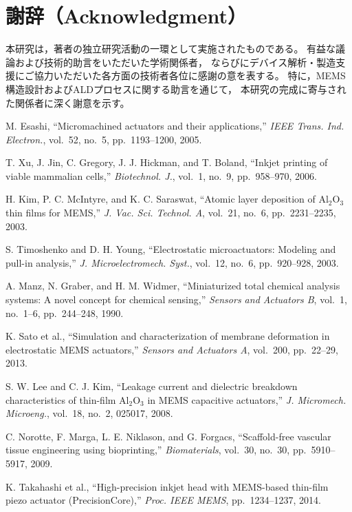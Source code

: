 \documentclass[conference]{IEEEtran}
\begin{document}
\section*{謝辞（Acknowledgment）}
本研究は，著者の独立研究活動の一環として実施されたものである。
有益な議論および技術的助言をいただいた学術関係者，
ならびにデバイス解析・製造支援にご協力いただいた各方面の技術者各位に感謝の意を表する。
特に，MEMS構造設計およびALDプロセスに関する助言を通じて，
本研究の完成に寄与された関係者に深く謝意を示す。

\balance

\begin{thebibliography}{99}

M. Esashi, ``Micromachined actuators and their applications,'' 
\emph{IEEE Trans. Ind. Electron.}, vol.~52, no.~5, pp.~1193–1200, 2005.

T. Xu, J. Jin, C. Gregory, J. J. Hickman, and T. Boland, 
``Inkjet printing of viable mammalian cells,'' 
\emph{Biotechnol. J.}, vol.~1, no.~9, pp.~958–970, 2006.

H. Kim, P. C. McIntyre, and K. C. Saraswat, 
``Atomic layer deposition of Al$_2$O$_3$ thin films for MEMS,'' 
\emph{J. Vac. Sci. Technol. A}, vol.~21, no.~6, pp.~2231–2235, 2003.

S. Timoshenko and D. H. Young, 
``Electrostatic microactuators: Modeling and pull-in analysis,'' 
\emph{J. Microelectromech. Syst.}, vol.~12, no.~6, pp.~920–928, 2003.

A. Manz, N. Graber, and H. M. Widmer, 
``Miniaturized total chemical analysis systems: A novel concept for chemical sensing,'' 
\emph{Sensors and Actuators B}, vol.~1, no.~1–6, pp.~244–248, 1990.

K. Sato et al., 
``Simulation and characterization of membrane deformation in electrostatic MEMS actuators,'' 
\emph{Sensors and Actuators A}, vol.~200, pp.~22–29, 2013.

S. W. Lee and C. J. Kim, 
``Leakage current and dielectric breakdown characteristics of thin-film Al$_2$O$_3$ in MEMS capacitive actuators,'' 
\emph{J. Micromech. Microeng.}, vol.~18, no.~2, 025017, 2008.

C. Norotte, F. Marga, L. E. Niklason, and G. Forgacs, 
``Scaffold-free vascular tissue engineering using bioprinting,'' 
\emph{Biomaterials}, vol.~30, no.~30, pp.~5910–5917, 2009.

K. Takahashi et al., 
``High-precision inkjet head with MEMS-based thin-film piezo actuator (PrecisionCore),'' 
\emph{Proc. IEEE MEMS}, pp.~1234–1237, 2014.

\end{thebibliography}
\end{document}
